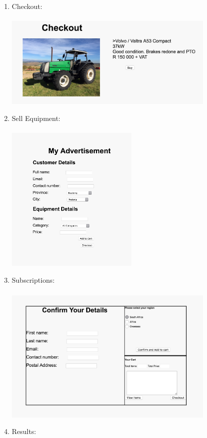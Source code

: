 \documentclass[11pt]{article}
\begin{document}
\begin{enumerate}
		\item Checkout: \\ \\
			\includegraphics[width=0.8\textwidth]{../Images/Pages/Checkout}
		\item Sell Equipment: \\ \\
			\includegraphics[width=0.5\textwidth]{../Images/Pages/SellEquipment} \newpage
		\item Subscriptions: \\ \\
			\includegraphics[width=0.8\textwidth]{../Images/Pages/Subscriptions}
		\item Results: \\ \\

\end{enumerate}
\end{document}
